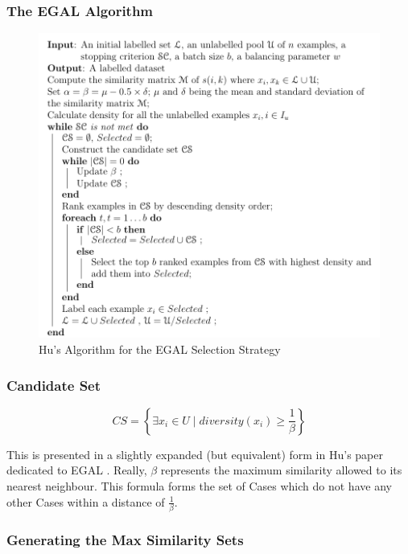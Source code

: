 \documentclass[a4paper,11pt]{report}
\begin{document}
\begin{samepage}

\subsubsection{The EGAL Algorithm} 

\begin{figure}[h!] \centering
\includegraphics[scale=0.75]{./Others/Hu2011EgalAlgorithm}
\caption*{Hu's Algorithm for the EGAL Selection Strategy}
\end{figure}

\end{samepage}

\subsubsection{Candidate Set}
\[
CS=\left\{ \exists x_{i}\in U\mid diversity(x_{i})\geq\frac{1}{\beta}\right\} 
\]

This is presented in a slightly expanded (but equivalent) form in Hu's paper dedicated to EGAL \citep{Hu2010}. Really, $\beta$ represents the maximum similarity allowed to its nearest neighbour. This formula forms the set of Cases which do not have any other Cases within a distance of $\frac{1}{\beta}$.

\subsubsection{Generating the Max Similarity Sets}
\end{document}
